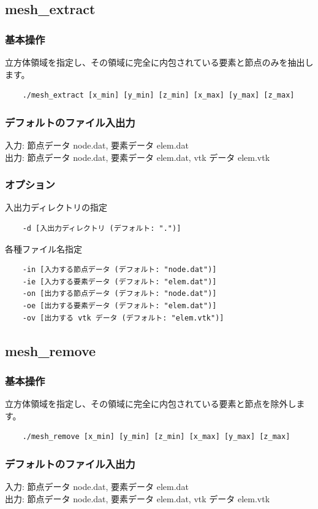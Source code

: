 \documentclass[8pt,a4paper]{article}
\begin{document}
\subsection{mesh\_extract}
\subsubsection*{基本操作}
立方体領域を指定し、その領域に完全に内包されている要素と節点のみを抽出します。
\begin{verbatim}
	./mesh_extract [x_min] [y_min] [z_min] [x_max] [y_max] [z_max]
\end{verbatim}

\subsubsection*{デフォルトのファイル入出力}
入力: 節点データ node.dat, 要素データ elem.dat \\ \noindent
出力: 節点データ node.dat, 要素データ elem.dat, vtk データ elem.vtk

\subsubsection*{オプション}
入出力ディレクトリの指定
\begin{verbatim}
    -d [入出力ディレクトリ (デフォルト: ".")]
\end{verbatim}
各種ファイル名指定
\begin{verbatim}
    -in [入力する節点データ (デフォルト: "node.dat")]
    -ie [入力する要素データ (デフォルト: "elem.dat")]
    -on [出力する節点データ (デフォルト: "node.dat")]
    -oe [出力する要素データ (デフォルト: "elem.dat")]
    -ov [出力する vtk データ (デフォルト: "elem.vtk")]
\end{verbatim}

\subsection{mesh\_remove}
\subsubsection*{基本操作}
立方体領域を指定し、その領域に完全に内包されている要素と節点を除外します。
\begin{verbatim}
	./mesh_remove [x_min] [y_min] [z_min] [x_max] [y_max] [z_max]
\end{verbatim}

\subsubsection*{デフォルトのファイル入出力}
入力: 節点データ node.dat, 要素データ elem.dat \\ \noindent
出力: 節点データ node.dat, 要素データ elem.dat, vtk データ elem.vtk
\end{document}
